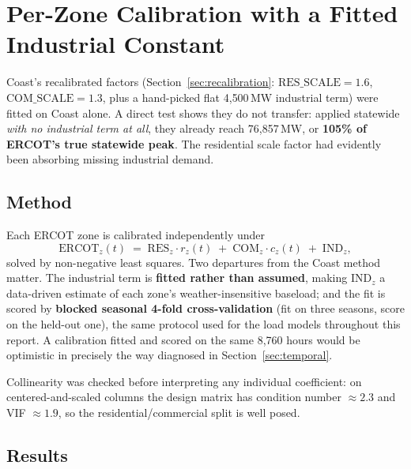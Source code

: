 \documentclass[11pt]{article}
\begin{document}
\section{Per-Zone Calibration with a Fitted Industrial Constant}
\label{sec:zonecal}

Coast's recalibrated factors (Section~\ref{sec:recalibration}: $\mathrm{RES\_SCALE}=1.6$,
$\mathrm{COM\_SCALE}=1.3$, plus a hand-picked flat 4{,}500\,MW industrial term) were fitted
on Coast alone. A direct test shows they do not transfer: applied statewide
\emph{with no industrial term at all}, they already reach 76{,}857\,MW, or \textbf{105\%
of ERCOT's true statewide peak}. The residential scale factor had evidently been
absorbing missing industrial demand.

\subsection{Method}

Each ERCOT zone is calibrated independently under
\[
\mathrm{ERCOT}_z(t) \;=\; \mathrm{RES}_z \cdot r_z(t) \;+\; \mathrm{COM}_z \cdot c_z(t) \;+\; \mathrm{IND}_z ,
\]
solved by non-negative least squares. Two departures from the Coast method matter. The
industrial term is \textbf{fitted rather than assumed}, making $\mathrm{IND}_z$ a
data-driven estimate of each zone's weather-insensitive baseload; and the fit is scored
by \textbf{blocked seasonal 4-fold cross-validation} (fit on three seasons, score on the
held-out one), the same protocol used for the load models throughout this report. A
calibration fitted and scored on the same 8{,}760 hours would be optimistic in precisely
the way diagnosed in Section~\ref{sec:temporal}.

Collinearity was checked before interpreting any individual coefficient: on
centered-and-scaled columns the design matrix has condition number $\approx 2.3$ and
VIF $\approx 1.9$, so the residential/commercial split is well posed.

\subsection{Results}
\end{document}
